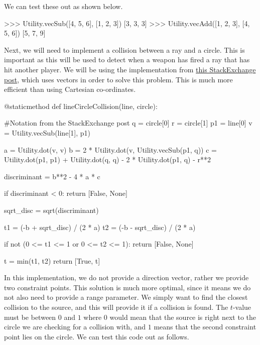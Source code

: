We can test these out as shown below.
\vs

\begin{mpy}
>>> Utility.vecSub([4, 5, 6], [1, 2, 3])
[3, 3, 3]
>>> Utility.vecAdd([1, 2, 3], [4, 5, 6])
[5, 7, 9]
\end{mpy}

\vs
Next, we will need to implement a collision between a ray and a circle. This is important as this will be used to detect when a weapon has fired a ray that has hit another player. We will be using the implementation from \href{https://codereview.stackexchange.com/questions/86421/line-segment-to-circle-collision-algorithm}{this StackExchange post}, which uses vectors in order to solve this problem. This is much more efficient than using Cartesian co-ordinates.

\vs
\begin{mpy}
    @staticmethod
    def lineCircleCollision(line, circle):
    
        #Notation from the StackExchange post
        q = circle[0]
        r = circle[1]
        p1 = line[0]
        v = Utility.vecSub(line[1], p1)

        a = Utility.dot(v, v)
        b = 2 * Utility.dot(v, Utility.vecSub(p1, q))
        c = Utility.dot(p1, p1) + Utility.dot(q, q) - 2 * Utility.dot(p1, q) - r**2

        discriminant = b**2 - 4 * a * c

        if discriminant < 0:
            return [False, None]

        sqrt_disc = sqrt(discriminant)
        
        t1 = (-b + sqrt_disc) / (2 * a)
        t2 = (-b - sqrt_disc) / (2 * a)

        if not (0 <= t1 <= 1 or 0 <= t2 <= 1):
            return [False, None]
        
        t = min(t1, t2)
        return [True, t]
\end{mpy}

\vs
In this implementation, we do not provide a direction vector, rather we provide two constraint points. This solution is much more optimal, since it means we do not also need to provide a range parameter. We simply want to find the closest collision to the source, and this will provide it if a collision is found. The $t$-value must be between $0$ and $1$ where $0$ would mean that the source is right next to the circle we are checking for a collision with, and $1$ means that the second constraint point lies on the circle. We can test this code out as follows.

